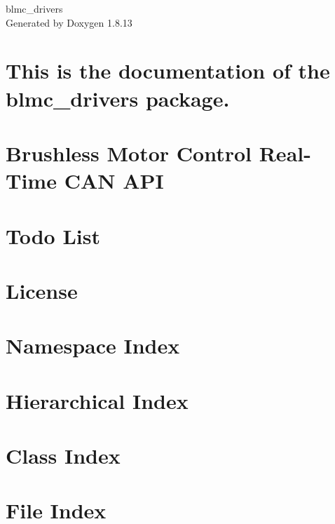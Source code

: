 \documentclass[twoside]{book}
\newcommand{\+}{\discretionary{\mbox{\scriptsize$\hookleftarrow$}}{}{}}
\newcommand{\clearemptydoublepage}{%
  \newpage{\pagestyle{empty}\cleardoublepage}%
}
\begin{document}
\hypersetup{pageanchor=false,
             bookmarksnumbered=true,
             pdfencoding=unicode
            }
\begin{titlepage}
\vspace*{7cm}
\begin{center}%
{\Large blmc\+\_\+drivers }\\
\vspace*{1cm}
{\large Generated by Doxygen 1.8.13}\\
\end{center}
\end{titlepage}
\clearemptydoublepage
{}
\tableofcontents
\clearemptydoublepage
{}
\hypersetup{pageanchor=true}

\chapter{This is the documentation of the blmc\+\_\+drivers package.}
\label{index}\hypertarget{index}{}
\chapter{Brushless Motor Control Real-\/\+Time C\+AN A\+PI}
\label{md_README}

\chapter{Todo List}
\label{todo}

\chapter{License}
\label{license}

\chapter{Namespace Index}

\chapter{Hierarchical Index}

\chapter{Class Index}

\chapter{File Index}

\end{document}
